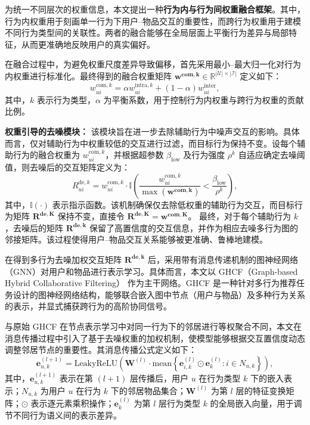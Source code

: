 为统一不同层次的权重信息，本文提出一种\textbf{行为内与行为间权重融合框架}。其中，行为内权重用于刻画单一行为下用户–物品交互的重要性，而跨行为权重用于建模不同行为类型间的关联性。两者的融合能够在全局层面上平衡行为差异与局部特征，从而更准确地反映用户的真实偏好。

在融合过程中，为避免权重尺度差异导致偏移，首先采用最小–最大归一化对行为内权重进行标准化。最终得到的融合权重矩阵 $\boldsymbol{w^{com, k}} \in \mathbb{R}^{|\mathcal{U}| \times |\mathcal{I}|}$ 定义如下：
\begin{equation}
    w^{\text{com}, k}_{ui} = \alpha w^{\text{intra}, k}_{ui} + (1 - \alpha) w^{\text{inter}}_{ui},
    \label{eq:w-com}
\end{equation}
其中，$k$ 表示行为类型，$\alpha$ 为平衡系数，用于控制行为内权重与跨行为权重的贡献比例。

\textbf{权重引导的去噪模块：}
该模块旨在进一步去除辅助行为中噪声交互的影响。具体而言，仅对辅助行为中权重较低的交互进行过滤，而目标行为保持不变。设每个辅助行为的融合权重为 $w^{\text{com},k}_{ui}$，并根据超参数 $\beta_{\text{low}}$ 及行为强度 $\rho^k$ 自适应确定去噪阈值，则去噪后的交互矩阵定义为：
\begin{equation}
    R_{ui}^{\text{de},k} = w_{ui}^{\text{com}, k} \cdot 
    \mathbb{I}\left(\frac{w_{ui}^{\text{com}, k}}{\max(\mathbf{w^{\text{com}, k}})} < 
    \frac{\beta_{\text{low}}}{\rho^k}\right),
\end{equation}
其中，$\mathbb{I}(\cdot)$ 表示指示函数。该机制确保仅去除低权重的辅助行为交互，而目标行为矩阵 $\boldsymbol{R^{\text{de},K}}$ 保持不变，直接令 $\boldsymbol{R^{\text{de},K}} = \boldsymbol{w^{\text{com},K}}$。  
最终，对于每个辅助行为 $k$，去噪后的矩阵 $\boldsymbol{R^{\text{de},k}}$ 保留了高置信度的交互信息，并作为相应去噪多行为图的邻接矩阵。该过程使得用户–物品交互关系能够被更准确、鲁棒地建模。

在得到多行为去噪加权交互矩阵 $\boldsymbol{R^{de,k}}$ 后，采用带有消息传递机制的图神经网络（GNN）对用户和物品进行表示学习。具体而言，本文以 GHCF（Graph-based Hybrid Collaborative Filtering）\cite{chen2021GHCF} 作为主干网络。GHCF 是一种针对多行为推荐任务设计的图神经网络结构，能够联合嵌入图中节点（用户与物品）及多种行为关系的表示，并显式捕获跨行为的高阶协同信号。

与原始 GHCF 在节点表示学习中对同一行为下的邻居进行等权聚合不同，本文在消息传播过程中引入了基于去噪权重的加权机制，使模型能够根据交互置信度动态调整邻居节点的重要性。其消息传播公式定义如下：
\begin{equation}
    \mathbf{e}^{(l+1)}_{u,k} = \text{LeakyReLU}\left(
    \mathbf{W}^{(l)} \cdot 
    \text{mean}\left\{
    \mathbf{e}^{(l)}_{i,k} \odot \mathbf{e}^{(l)}_{k} : i \in N_{u,k}
    \right\}
    \right),
\end{equation}
其中，$\mathbf{e}^{(l+1)}_{u,k}$ 表示在第 $(l+1)$ 层传播后，用户 $u$ 在行为类型 $k$ 下的嵌入表示；$N_{u,k}$ 为用户 $u$ 在行为 $k$ 下的邻居物品集合；$\mathbf{W}^{(l)}$ 为第 $l$ 层的特征变换矩阵；$\odot$ 表示逐元素乘积操作；$\mathbf{e}^{(l)}_{k}$ 为第 $l$ 层行为类型 $k$ 的全局嵌入向量，用于调节不同行为语义间的表示差异。

